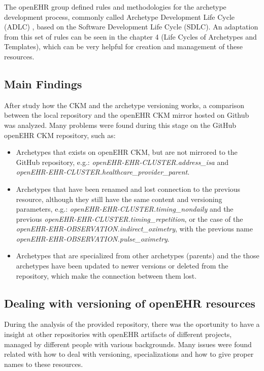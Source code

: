 \documentclass[mim_thesis.tex]{subfiles}
\begin{document}
The openEHR group defined rules and methodologies for the archetype development process, commonly called Archetype Development Life Cycle (ADLC) \citep{Madsen2010}, based on the Software Development Life Cycle (SDLC). An adaptation from this set of rules can be seen in the chapter 4 (Life Cycles of Archetypes and Templates), which can be very helpful for creation and management of these resources.



\subsection{Main Findings}
After study how the CKM and the archetype versioning works, a comparison between the local repository and the openEHR CKM mirror hosted on Github was analyzed. Many problems were found during this stage on the GitHub openEHR CKM repository, such as:

\begin{itemize}
\item Archetypes that exists on openEHR CKM, but are not mirrored to the GitHub repository, e.g.: \textit{openEHR-EHR-CLUSTER.address\_isa} and \textit{openEHR-EHR-CLUSTER.healthcare\_provider\_parent}.
\item Archetypes that have been renamed and lost connection to the previous resource, although they still have the same content and versioning parameters, e.g.: \textit{openEHR-EHR-CLUSTER.timing\_nondaily} and the previous \textit{openEHR-EHR-CLUSTER.timing\_repetition}, or the case of the \textit{openEHR-EHR-OBSERVATION.indirect\_oximetry}, with the previous name \textit{openEHR-EHR-OBSERVATION.pulse\_oximetry}. 
\item Archetypes that are specialized from other archetypes (parents) and the those archetypes have been updated to newer versions or deleted from the repository, which make the connection between them lost.
\end{itemize}



\subsection{Dealing with versioning of openEHR resources}

During the analysis of the provided repository, there was the oportunity to have a insight at other repositories with openEHR artifacts of different projects, managed by different people with various backgrounds. Many issues were found related with how to deal with versioning, specializations and how to give proper names to these resources.  
\end{document}
